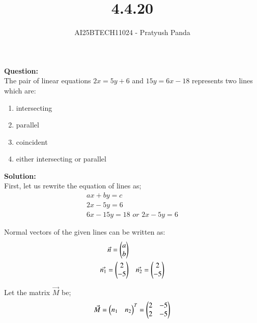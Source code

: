 \documentclass[journal]{IEEEtran}
\begin{document}

\vspace{3cm}

\title{4.4.20}
\author{AI25BTECH11024 - Pratyush Panda
}
\maketitle
{\let\newpage\relax\maketitle}

\renewcommand{\thefigure}{\theenumi}
\renewcommand{\thetable}{\theenumi}
\setlength{\intextsep}{10pt} %


\renewcommand{\thetable}{\theenumi}

\textbf{Question: } \\
The pair of linear equations $2x=5y+6$ and $15y=6x-18$ represents two lines which are: 
\begin{enumerate}
\item intersecting
\item parallel
\item coincident
\item either intersecting or parallel
\end{enumerate}
\vspace{0.7cm}

\textbf{Solution: } \\
First, let us rewrite the equation of lines as;
\begin{align}
ax+by=c \\
2x-5y=6 \\
6x-15y=18 \textit{ or } 2x-5y=6
\end{align}

Normal vectors of the given lines can be written as:
\begin{align}
\Vec{n}=\begin{pmatrix}a \\ b\end{pmatrix} \\
\Vec{n_1}=\begin{pmatrix}2 \\ -5\end{pmatrix} && \Vec{n_2}=\begin{pmatrix}2 \\ -5\end{pmatrix}
\end{align}

Let the matrix $\Vec{M}$ be;
\begin{align}
\Vec{M}=\begin{pmatrix}n_1 & n_2\end{pmatrix}^T=\begin{pmatrix}2 & -5 \\ 2 & -5\end{pmatrix}
\end{align}
\end{document}
